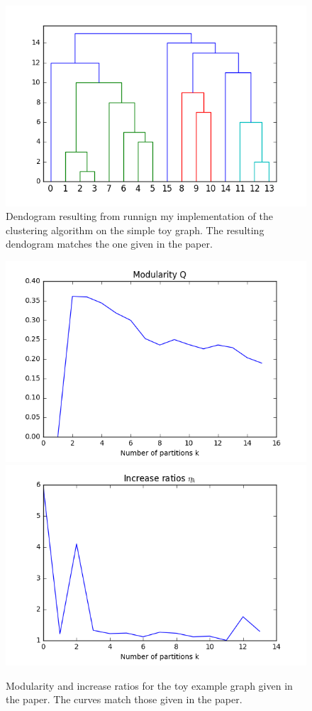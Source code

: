 \documentclass[12pt]{article}
\theoremstyle{definition}
\begin{document}
\begin{figure}
	\includegraphics[scale=0.5]{toy_graph_dendogram}
	\centering
	\caption{Dendogram resulting from runnign my implementation of the clustering algorithm on the simple toy graph. The resulting dendogram matches the one given in the paper.}
	\label{fig_toy_graph_dendogram}
\end{figure}
\begin{figure}
	\includegraphics[scale=0.44]{toy_graph_Q}
	\includegraphics[scale=0.44]{toy_graph_eta}
	\centering
	\caption{Modularity and increase ratios for the toy example graph given in the paper. The curves match those given in the paper.}
	\label{fig_toy_graph_eval}
\end{figure}
\end{document}
